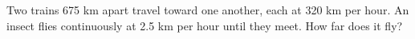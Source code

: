 Two trains 675 km apart travel toward one another, each at 320 km per hour. An insect flies continuously at 2.5 km per hour until they meet. How far does it fly?
